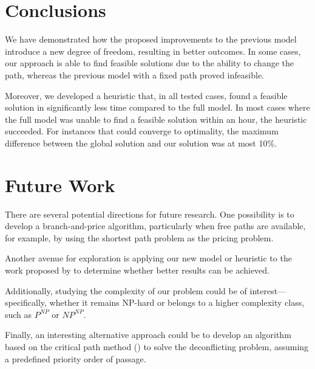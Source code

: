 \documentclass[../../thesis.tex]{subfiles}
\begin{document}
\section{Conclusions}  
We have demonstrated how the proposed improvements to the previous model introduce a new degree of freedom, resulting in better outcomes. In some cases, our approach is able to find feasible solutions due to the ability to change the path, whereas the previous model with a fixed path proved infeasible.

Moreover, we developed a heuristic that, in all tested cases, found a feasible solution in significantly less time compared to the full model. In most cases where the full model was unable to find a feasible solution within an hour, the heuristic succeeded. For instances that could converge to optimality, the maximum difference between the global solution and our solution was at most 10\%.
 
\section{Future Work}  
There are several potential directions for future research. One possibility is to develop a branch-and-price algorithm, particularly when free paths are available, for example, by using the shortest path problem as the pricing problem.  

Another avenue for exploration is applying our new model or heuristic to the work proposed by \cite{portoleau-2024} to determine whether better results can be achieved.  

Additionally, studying the complexity of our problem could be of interest—specifically, whether it remains NP-hard or belongs to a higher complexity class, such as $P^{NP}$ or $NP^{NP}$.  

Finally, an interesting alternative approach could be to develop an algorithm based on the critical path method (\cite{kelley_critical-path_1959}) to solve the deconflicting problem, assuming a predefined priority order of passage.  
\end{document}
